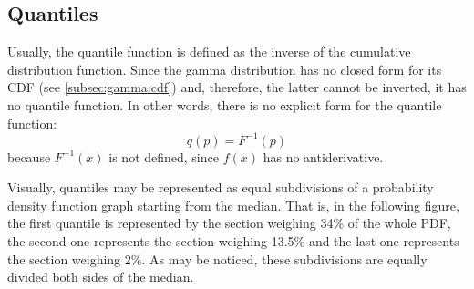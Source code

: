 \documentclass[12pt]{article}
\begin{document}
\pagebreak
\subsection{Quantiles}
Usually, the quantile function is defined as the inverse of the cumulative distribution function. Since the gamma
distribution has no closed form for its CDF (see \autoref{subsec:gamma:cdf}) and, therefore, the latter cannot be
inverted, it has no quantile function. In other words, there is no explicit form for the quantile function:
\begin{equation}
	q(p)=F^{-1}(p)
\end{equation}
because $F^{-1}(x)$ is not defined, since $f(x)$ has no antiderivative.

Visually, quantiles may be represented as equal subdivisions of a probability density function graph starting from the
median. That is, in the following figure, the first quantile is represented by the section weighing 34\% of the whole
PDF, the second one represents the section weighing 13.5\% and the last one represents the section weighing 2\%. As may
be noticed, these subdivisions are equally divided both sides of the median.



\pagebreak
\end{document}
